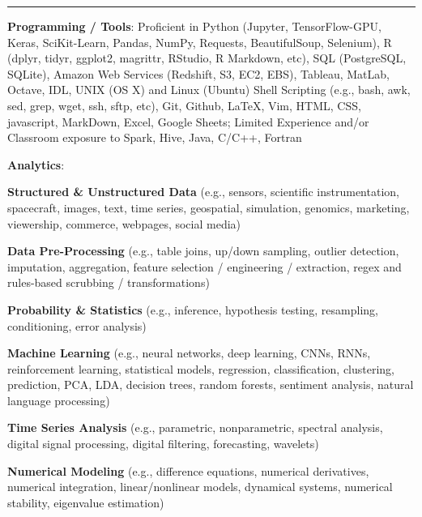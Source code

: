 \documentclass[10pt]{article}
\newcommand{\ressection}[1]{\noindent{\large\textbf{#1}}
\vspace{2pt}\hrule\vspace{4pt}}
\begin{document}


\vspace{0.5cm}
\ressection{Computing Skills}
\noindent\textbf{Programming / Tools}: Proficient in Python  
(Jupyter, TensorFlow-GPU, Keras, SciKit-Learn, Pandas, NumPy, Requests,
BeautifulSoup, Selenium), R (dplyr, tidyr,
ggplot2, magrittr, RStudio, R Markdown, etc), SQL (PostgreSQL, SQLite),
Amazon Web Services (Redshift, S3, EC2, EBS), Tableau, MatLab, Octave, IDL, 
UNIX (OS X) and Linux (Ubuntu) Shell Scripting (e.g., bash, awk, sed,
grep, wget, ssh, sftp, etc), Git, Github, 
LaTeX, Vim, HTML, CSS, javascript, MarkDown, Excel, Google Sheets; 
Limited Experience and/or Classroom exposure to Spark, Hive, Java, C/C++, Fortran
  \vspace{0.1in}

\noindent\textbf{Analytics}:
\vspace{-0.2cm}
\begin{itemize*}
  \item \textbf{Structured \& Unstructured Data} (e.g., sensors,
    scientific instrumentation, spacecraft, 
    images, text, time series, geospatial, simulation, 
    genomics, marketing, viewership, commerce, webpages, social media)
  \item \textbf{Data Pre-Processing} (e.g., table joins, up/down sampling, outlier detection, 
    imputation, aggregation, feature selection / engineering /
    extraction, regex and rules-based scrubbing / transformations)
  \item \textbf{Probability \& Statistics} (e.g., inference,
    hypothesis testing, resampling, conditioning, error analysis)
  \item \textbf{Machine Learning} (e.g., neural networks,
    deep learning, CNNs, RNNs, reinforcement learning, statistical
    models, regression, classification, clustering, prediction,
    PCA, LDA, decision trees, random forests, sentiment analysis,
    natural language processing)
  \item \textbf{Time Series Analysis} (e.g., parametric, nonparametric, spectral
    analysis, digital signal processing, digital filtering, forecasting,
    wavelets)
  \item \textbf{Numerical Modeling}
    (e.g., difference equations, numerical derivatives, numerical
    integration, linear/nonlinear models, dynamical systems, numerical stability, 
    eigenvalue estimation)
\end{itemize*}
\end{document}

